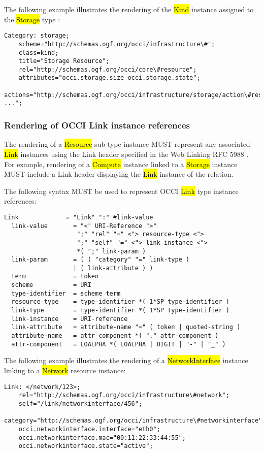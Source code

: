 \documentclass[10pt,a4paper]{article}
\begin{document}
The following example illustrates the rendering of the \hl{Kind} instance
assigned to the \hl{Storage} type \cite{occi:infrastructure}:
\begin{verbatim}
Category: storage;
    scheme="http://schemas.ogf.org/occi/infrastructure\#";
    class=kind;
    title="Storage Resource";
    rel="http://schemas.ogf.org/occi/core\#resource";
    attributes="occi.storage.size occi.storage.state";
    actions="http://schemas.ogf.org/occi/infrastructure/storage/action\#resize ...";
\end{verbatim}

\subsubsection{Rendering of OCCI Link instance references}
The rendering of a \hl{Resource} sub-type instance \cite{occi:core}
MUST represent any associated \hl{Link} instances using the Link
header specified in the Web Linking RFC 5988 \cite{rfc5988}.  For
example, rendering of a \hl{Compute} instance linked to a \hl{Storage}
instance MUST include a Link header displaying the \hl{Link} instance
of the relation.

The following syntax MUST be used to represent OCCI \hl{Link} type
instance references:

\begin{verbatim}
Link             = "Link" ":" #link-value
  link-value       = "<" URI-Reference ">"
                    ";" "rel" "=" <"> resource-type <">
                    ";" "self" "=" <"> link-instance <">
                    *( ";" link-param )
  link-param       = ( ( "category" "=" link-type )
                   | ( link-attribute ) )
  term             = token
  scheme           = URI
  type-identifier  = scheme term
  resource-type    = type-identifier *( 1*SP type-identifier )
  link-type        = type-identifier *( 1*SP type-identifier )
  link-instance    = URI-reference
  link-attribute   = attribute-name "=" ( token | quoted-string )
  attribute-name   = attr-component *( "." attr-component )
  attr-component   = LOALPHA *( LOALPHA | DIGIT | "-" | "_" )
\end{verbatim}

The following example illustrates the rendering of a \hl{NetworkInterface}
\cite{occi:infrastructure} instance linking to a \hl{Network} resource
instance:
\begin{verbatim}
Link: </network/123>;
    rel="http://schemas.ogf.org/occi/infrastructure\#network";
    self="/link/networkinterface/456";
    category="http://schemas.ogf.org/occi/infrastructure\#networkinterface";
    occi.networkinterface.interface="eth0";
    occi.networkinterface.mac="00:11:22:33:44:55";
    occi.networkinterface.state="active";
\end{verbatim}
\end{document}
